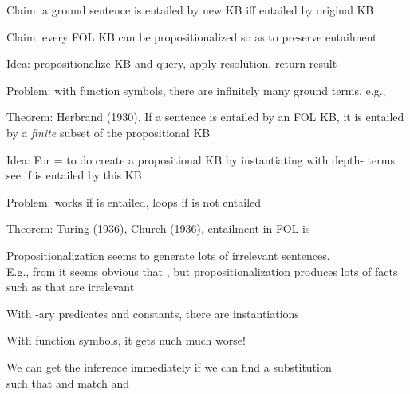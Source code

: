 \documentclass{article}
\begin{document}
\begin{huge}

Claim: a ground sentence\mat{$^*$} is entailed by new KB iff entailed by original KB

Claim: every FOL KB can be propositionalized so as to preserve entailment

Idea: propositionalize KB and query, apply resolution, return result

Problem: with function symbols, there are infinitely many ground terms,\al
  e.g., 

Theorem: Herbrand (1930). If a sentence \mat{$\alpha$} is entailed by an FOL KB,\nl
  it is entailed by a \emph{finite} subset of the propositional KB

Idea: For  =  to \mat{$\infty$} do\nl
    create a propositional KB by instantiating with depth- terms\nl
    see if \mat{$\alpha$} is entailed by this KB

Problem: works if \mat{$\alpha$} is entailed, loops if \mat{$\alpha$} is not entailed

Theorem: Turing (1936), Church (1936), entailment in FOL is 



Propositionalization seems to generate lots of irrelevant sentences.\\
E.g., from 
it seems obvious that , but propositionalization produces
lots of facts such as  that are irrelevant

With  -ary predicates and  constants, there are  instantiations

With function symbols, it gets nuch much worse!




We can get the inference immediately if we can find a substitution \mat{$\theta$}\\
such that  and  match  and 


\end{huge}
\end{document}
